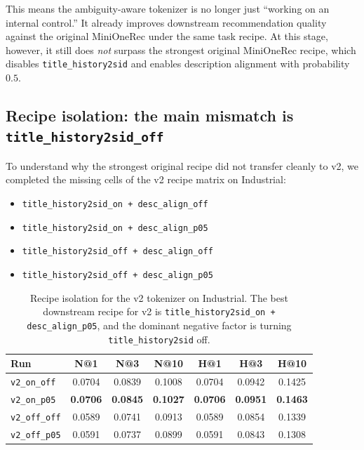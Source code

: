 This means the ambiguity-aware tokenizer is no longer just ``working on an internal control.'' It already improves downstream recommendation quality against the original MiniOneRec under the same task recipe. At this stage, however, it still does \emph{not} surpass the strongest original MiniOneRec recipe, which disables \texttt{title\_history2sid} and enables description alignment with probability $0.5$.

\subsection{Recipe isolation: the main mismatch is \texttt{title\_history2sid\_off}}

To understand why the strongest original recipe did not transfer cleanly to v2, we completed the missing cells of the v2 recipe matrix on Industrial:
\begin{itemize}[leftmargin=1.4em]
  \item \texttt{title\_history2sid\_on + desc\_align\_off}
  \item \texttt{title\_history2sid\_on + desc\_align\_p05}
  \item \texttt{title\_history2sid\_off + desc\_align\_off}
  \item \texttt{title\_history2sid\_off + desc\_align\_p05}
\end{itemize}

\begin{table}[t]
  \centering
  \caption{Recipe isolation for the v2 tokenizer on Industrial. The best downstream recipe for v2 is \texttt{title\_history2sid\_on + desc\_align\_p05}, and the dominant negative factor is turning \texttt{title\_history2sid} off.}
  \label{tab:v2recipe}
  \begin{tabular}{lcccccc}
    \toprule
    Run & N@1 & N@3 & N@10 & H@1 & H@3 & H@10 \\
    \midrule
    \texttt{v2\_on\_off} & 0.0704 & 0.0839 & 0.1008 & 0.0704 & 0.0942 & 0.1425 \\
    \texttt{v2\_on\_p05} & \textbf{0.0706} & \textbf{0.0845} & \textbf{0.1027} & \textbf{0.0706} & \textbf{0.0951} & \textbf{0.1463} \\
    \texttt{v2\_off\_off} & 0.0589 & 0.0741 & 0.0913 & 0.0589 & 0.0854 & 0.1339 \\
    \texttt{v2\_off\_p05} & 0.0591 & 0.0737 & 0.0899 & 0.0591 & 0.0843 & 0.1308 \\
    \bottomrule
  \end{tabular}
\end{table}

